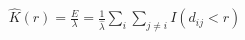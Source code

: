 \documentclass[preview]{standalone}
\begin{document}
\begin{align*}
\hat{K}(r) = \frac{E}{\lambda} = \frac{1}{\hat{\lambda}} \sum_{i} \sum_{j \neq i} I(d_{ij} < r)
\end{align*}
\end{document}
